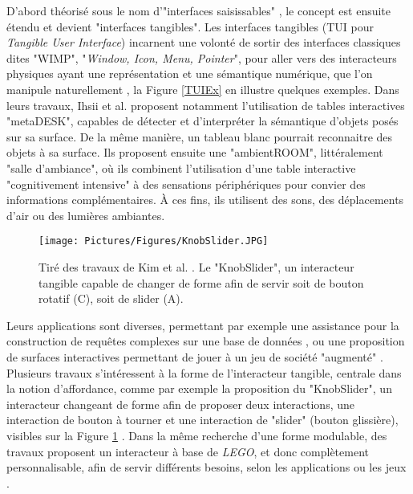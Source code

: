 			D'abord théorisé sous le nom d'"interfaces saisissables" \cite{fitzmaurice_bricks_1995}, le concept est ensuite étendu et devient "interfaces tangibles". Les interfaces tangibles (TUI pour \textit{Tangible User Interface}) incarnent une volonté de sortir des interfaces classiques dites "WIMP", "\textit{Window, Icon, Menu, Pointer}", pour aller vers des interacteurs physiques ayant une représentation et une sémantique numérique, que l'on manipule naturellement \cite{ishii_tangible_1997}, la Figure \ref{TUIEx} en illustre quelques exemples. Dans leurs travaux, Ihsii et al. \cite{ishii_tangible_1997} proposent notamment l'utilisation de tables interactives "metaDESK", capables de détecter et d'interpréter la sémantique d'objets posés sur sa surface. De la même manière, un tableau blanc pourrait reconnaitre des objets à sa surface. Ils proposent ensuite une "ambientROOM", littéralement "salle d'ambiance", où ils combinent l'utilisation d'une table interactive "cognitivement intensive" à des sensations périphériques pour convier des informations complémentaires. À ces fins, ils utilisent des sons, des déplacements d'air ou des lumières ambiantes.
			
			\begin{figure}
			\centering
			\texttt{[image: Pictures/Figures/KnobSlider.JPG]}
			\caption[Le "KnobSlider" tiré des travaux de Kim et al. \cite{kim_knobslider_2019}]{Tiré des travaux de Kim et al. \cite{kim_knobslider_2019}. Le "KnobSlider", un interacteur tangible capable de changer de forme afin de servir soit de bouton rotatif (C), soit de slider (A).}
			\label{KnobSlider}
		\end{figure}
			
			Leurs applications sont diverses, permettant par exemple une assistance pour la construction de requêtes complexes sur une base de données \cite{pereda_tui_2019}, ou une proposition de surfaces interactives permettant de jouer à un jeu de société "augmenté" \cite{villar_project_2018}. Plusieurs travaux s'intéressent à la forme de l'interacteur tangible, centrale dans la notion d'affordance, comme par exemple la proposition du "KnobSlider", un interacteur changeant de forme afin de proposer deux interactions, une interaction de bouton à tourner et une interaction de "slider" (bouton glissière), visibles sur la Figure \ref{KnobSlider} \cite{kim_knobslider_2019}. Dans la même recherche d'une forme modulable, des travaux proposent un interacteur à base de \textit{LEGO}, et donc complètement personnalisable, afin de servir différents besoins, selon les applications ou les jeux \cite{arora_virtualbricks_2019}.
				
